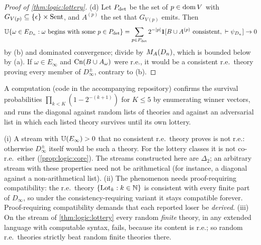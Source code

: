 \begin{proof}[Proof of \cref{thm:logic:lottery}]
(d) Let $P_{\rm det}$ be the set of $p\in\operatorname{dom} V$ with $G_{V(p)}\subseteq\{\epsilon\}\times\mathrm{Sent}$, and $A^{(p)}$ the set that $G_{V(p)}$ emits. Then
\[
\Unif\{\omega\in E_{D_n}:\omega\text{ begins with some }p\in P_{\rm det}\}=\sum_{p\in P_{\rm det}}2^{-\lvert p\rvert}\ind[B\cup A^{(p)}\text{ consistent},\ \vdash\psi_{D_n}]\to0
\]
by (b) and dominated convergence; divide by $M_{A}(D_n)$, which is bounded below by (a). If $\omega\in E_\infty$ and $\mathrm{Cn}(B\cup A_\omega)$ were r.e., it would be a consistent r.e.\ theory proving every member of $D_\infty^\pm$, contrary to (b).
\end{proof}

A computation (code in the accompanying repository) confirms the survival probabilities $\prod_{k<K}(1-2^{-(k+1)})$ for $K\le5$ by enumerating winner vectors, and runs the diagonal against random lists of theories and against an adversarial list in which each listed theory survives until its own lottery.

\begin{remark}\label{rem:logic:lotteryremarks}
(i) A stream with $\mathbb{U}(E_\infty)>0$ that no consistent r.e.\ theory proves is not r.e.: otherwise $D_\infty^\pm$ itself would be such a theory. For the lottery classes it is not co-r.e.\ either (\cref{prop:logic:core}). The streams constructed here are $\Delta_2$; an arbitrary stream with these properties need not be arithmetical (for instance, a diagonal against a non-arithmetical list). (ii) The phenomenon needs proof-requiring compatibility: the r.e.\ theory $\{\mathrm{Lot}_k:k\in\mathbb N\}$ is consistent with every finite part of $D_\infty$, so under the consistency-requiring variant it stays compatible forever. Proof-requiring compatibility demands that each reported loser be \emph{derived}. (iii) On the stream of \cref{thm:logic:lottery} every random \emph{finite} theory, in any extended language with computable syntax, fails, because its content is r.e.; so random r.e.\ theories strictly beat random finite theories there.
\end{remark}


